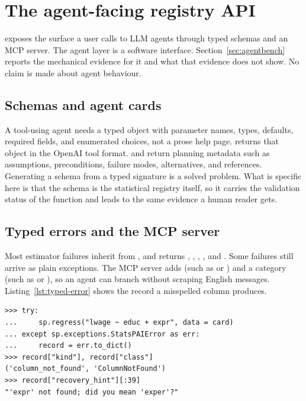 \section{The agent-facing registry API}\label{sec:agent}

\statspai{} exposes the surface a  user calls to LLM
agents through typed schemas and an MCP server. The agent layer is a
software interface. Section~\ref{sec:agentbench} reports the mechanical
evidence for it and what that evidence does not show. No claim is made about
agent behaviour.

\subsection{Schemas and agent cards}\label{sec:why-schema}\label{sec:fn-schema}

A tool-using agent needs a typed object with parameter names, types,
defaults, required fields, and enumerated choices, not a prose help page.
 returns that object in the OpenAI tool
format.  and 
return planning metadata such as assumptions, preconditions, failure
modes, alternatives, and references. Generating a schema from a typed
signature is a solved problem. What is specific here is that the schema is
the statistical registry itself, so it carries the validation status of the
function and leads to the same evidence a human reader gets.

\subsection{Typed errors and the MCP server}\label{sec:exception-envelope}\label{sec:mcp}

Most estimator failures inherit from , and
 returns , ,
, , and
. Some failures still arrive as plain 
exceptions. The MCP server adds  (such as
 or ) and a
 category (such as  or
), so an agent can branch without scraping English
messages. Listing~\ref{lst:typed-error} shows the record a misspelled
column produces.

\begin{lstlisting}[caption={A typed error, as a dictionary. An MCP client
receives this record with the additional \code{error\_kind} and
\code{remediation} fields.},label={lst:typed-error},captionpos=b]
>>> try:
...     sp.regress("lwage ~ educ + expr", data = card)
... except sp.exceptions.StatsPAIError as err:
...     record = err.to_dict()
>>> record["kind"], record["class"]
('column_not_found', 'ColumnNotFound')
>>> record["recovery_hint"][:39]
"'expr' not found; did you mean 'exper'?"
\end{lstlisting}

